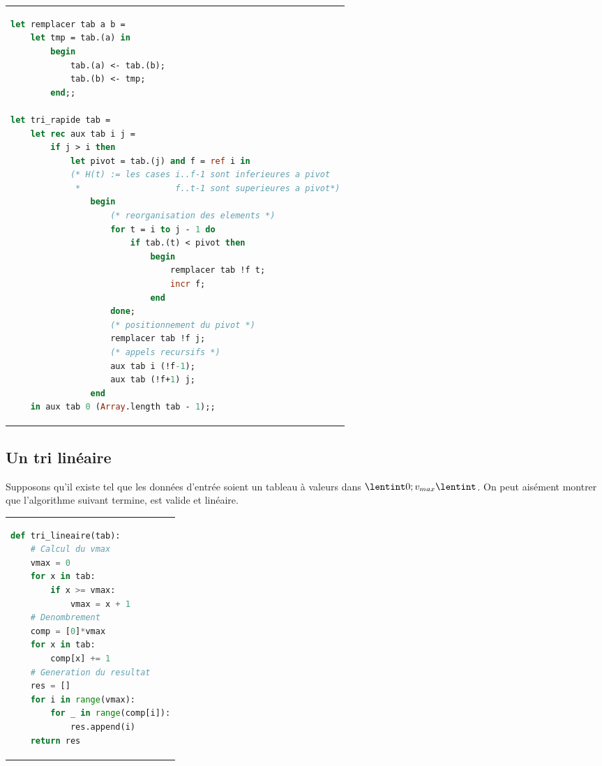 \documentclass{hibiscus}
\begin{document}
\begin{tabular}{l}
\begin{lstlisting}[language=Caml]
let remplacer tab a b =
    let tmp = tab.(a) in
        begin
            tab.(a) <- tab.(b);
            tab.(b) <- tmp;
        end;;

let tri_rapide tab =
    let rec aux tab i j =
        if j > i then
            let pivot = tab.(j) and f = ref i in
            (* H(t) := les cases i..f-1 sont inferieures a pivot
             *                   f..t-1 sont superieures a pivot*)
                begin
                    (* reorganisation des elements *)
                    for t = i to j - 1 do
                        if tab.(t) < pivot then
                            begin
                                remplacer tab !f t;
                                incr f;
                            end
                    done;
                    (* positionnement du pivot *)
                    remplacer tab !f j;
                    (* appels recursifs *)
                    aux tab i (!f-1);
                    aux tab (!f+1) j;
                end
    in aux tab 0 (Array.length tab - 1);;
\end{lstlisting}
\end{tabular}

\subsection{Un tri linéaire}


\par Supposons qu'il existe  tel que les données d'entrée soient un tableau à valeurs dans $\lentint 0; v_{max} \lentint$. On peut aisément montrer que l'algorithme suivant termine, est valide et linéaire.

\medskip \begin{tabular}{l}
\begin{lstlisting}[language=Python]
def tri_lineaire(tab):
    # Calcul du vmax
    vmax = 0
    for x in tab:
        if x >= vmax:
            vmax = x + 1
    # Denombrement
    comp = [0]*vmax
    for x in tab:
        comp[x] += 1
    # Generation du resultat
    res = []
    for i in range(vmax):
        for _ in range(comp[i]):
            res.append(i)
    return res
\end{lstlisting}
\end{tabular}

\end{document}
